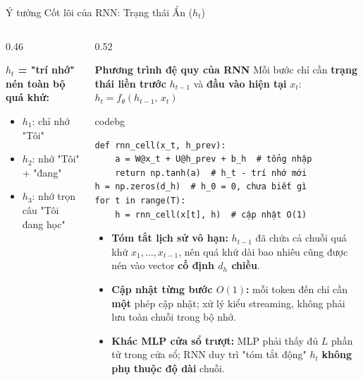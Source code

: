 \documentclass[aspectratio=169, 10pt]{beamer}
\newenvironment{codebox}{\begin{beamercolorbox}[sep=3pt, rounded=true]{codebg}\footnotesize\ttfamily}{\end{beamercolorbox}}
\begin{document}
\begin{frame}[fragile]{Ý tưởng Cốt lõi của RNN: Trạng thái Ẩn (\(h_t\))}
\begin{columns}[T]
\begin{column}{0.46\textwidth}
\begin{center}
\end{center}
\vspace{-0.05cm}
{\footnotesize
\textbf{\(h_t\) = "trí nhớ" nén toàn bộ quá khứ:}
\begin{itemize}\itemsep1pt
    \item \(h_1\): chỉ nhớ "Tôi"
    \item \(h_2\): nhớ "Tôi" + "đang"
    \item \(h_3\): nhớ trọn câu "Tôi đang học"
\end{itemize}}
\end{column}
\begin{column}{0.52\textwidth}
\begin{exampleblock}{\textbf{Phương trình đệ quy của RNN}}
{\footnotesize Mỗi bước chỉ cần \textbf{trạng thái liền trước} \(h_{t-1}\) và \textbf{đầu vào hiện tại} \(x_t\): \(h_t = f_\theta\!\left(h_{t-1},\, x_t\right)\)}
\end{exampleblock}
\vspace{-0.06cm}
\begin{codebox}\begin{verbatim}
def rnn_cell(x_t, h_prev):
    a = W@x_t + U@h_prev + b_h  # tổng nhập
    return np.tanh(a)  # h_t - trí nhớ mới
h = np.zeros(d_h)  # h_0 = 0, chưa biết gì
for t in range(T):
    h = rnn_cell(x[t], h)  # cập nhật O(1)
\end{verbatim}\end{codebox}
\vspace{-0.02cm}
{\scriptsize
\begin{itemize}\itemsep1pt
    \item \textbf{Tóm tắt lịch sử vô hạn:} \(h_{t-1}\) đã chứa cả chuỗi quá khứ \(x_1, \ldots, x_{t-1}\), nên quá khứ dài bao nhiêu cũng được nén vào vector \textbf{cố định \(d_h\) chiều}.
    \item \textbf{Cập nhật từng bước \(O(1)\):} mỗi token đến chỉ cần \textbf{một} phép cập nhật; xử lý kiểu streaming, không phải lưu toàn chuỗi trong bộ nhớ.
    \item \textbf{Khác MLP cửa sổ trượt:} MLP phải thấy đủ \(L\) phần tử trong cửa sổ; RNN duy trì "tóm tắt động" \(h_t\) \textbf{không phụ thuộc độ dài} chuỗi.
\end{itemize}}
\end{column}
\end{columns}
\end{frame}
\end{document}
